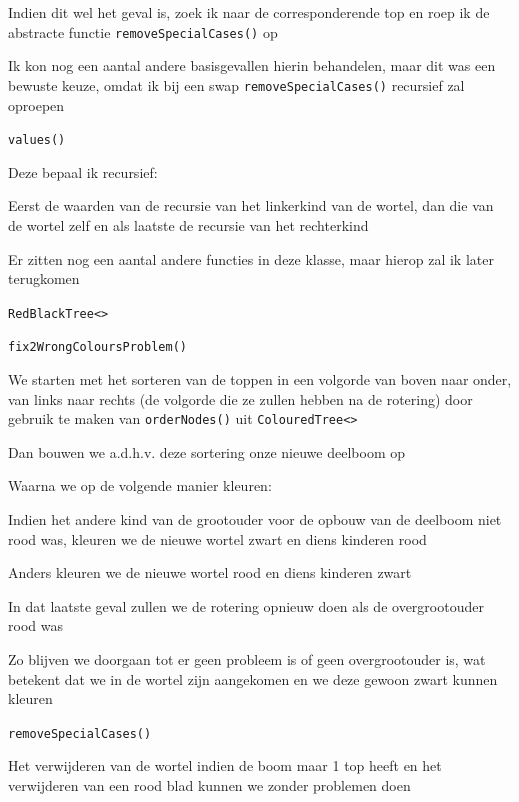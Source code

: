 \documentclass{article}
\def\code#1{\texttt{#1}}
\begin{document}
Indien dit wel het geval is, zoek ik naar de corresponderende top en roep ik de abstracte functie \code{removeSpecialCases()} op

Ik kon nog een aantal andere basisgevallen hierin behandelen, maar dit was een bewuste keuze, omdat ik bij een swap \code{removeSpecialCases()} recursief zal oproepen

\newpage

\code{values()}

Deze bepaal ik recursief:

Eerst de waarden van de recursie van het linkerkind van de wortel, dan die van de wortel zelf en als laatste de recursie van het rechterkind

\vspace{0.2cm}

Er zitten nog een aantal andere functies in deze klasse, maar hierop zal ik later terugkomen

\vspace{0.5cm}

\Large \code{RedBlackTree<>}

\vspace{0.3cm}

\large

\code{fix2WrongColoursProblem()}

We starten met het sorteren van de toppen in een volgorde van boven naar onder, van links naar rechts (de volgorde die ze zullen hebben na de rotering) door gebruik te maken van \code{orderNodes()} uit \code{ColouredTree<>}

Dan bouwen we a.d.h.v. deze sortering onze nieuwe deelboom op

Waarna we op de volgende manier kleuren:

Indien het andere kind van de grootouder voor de opbouw van de deelboom niet rood was, kleuren we de nieuwe wortel zwart en diens kinderen rood

Anders kleuren we de nieuwe wortel rood en diens kinderen zwart

In dat laatste geval zullen we de rotering opnieuw doen als de overgrootouder rood was

Zo blijven we doorgaan tot er geen probleem is of geen overgrootouder is, wat betekent dat we in de wortel zijn aangekomen en we deze gewoon zwart kunnen kleuren

\vspace{0.2cm}

\code{removeSpecialCases()}

Het verwijderen van de wortel indien de boom maar 1 top heeft en het verwijderen van een rood blad kunnen we zonder problemen doen
\end{document}

